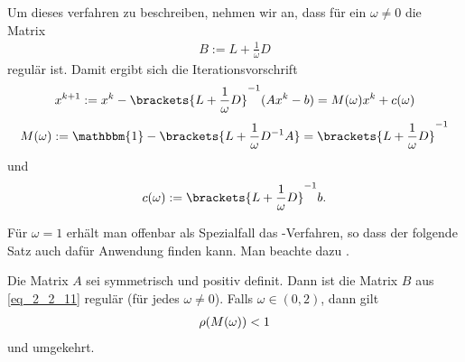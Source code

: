 Um dieses verfahren zu beschreiben, nehmen wir an, dass für ein $\omega \neq 0$ die Matrix
\begin{align}
	B:=L + \frac{1}{\omega}D \label{eq_2_2_11}
\end{align}
regulär ist. Damit ergibt sich die Iterationsvorschrift
\begin{align}
	x^{k+1} := x^k - \brackets{L+\frac{1}{\omega}D}^{-1}(Ax^k - b) = M(\omega)x^k + c(\omega)\notag
\end{align}
\begin{align}
	M(\omega) := \mathbbm{1} -  \brackets{L + \frac{1}{\omega} D^{-1} A} 
	= \brackets{L + \frac{1}{\omega} D}^{-1}
\end{align}
und
\begin{align}
	c(\omega) :=  \brackets{L+\frac{1}{\omega}D}^{-1}b.
\end{align}

Für $\omega = 1$ erhält man offenbar als Spezialfall das -Verfahren, so dass der folgende Satz auch dafür Anwendung finden kann. Man beachte dazu .

\begin{proposition}
	Die Matrix $A$ sei symmetrisch und positiv definit. Dann ist die Matrix $B$ aus \cref{eq_2_2_11} regulär (für jedes $\omega \neq 0$). Falls $\omega \in (0,2)$, dann gilt
	\begin{align}
		\rho(M(\omega)) < 1\notag
	\end{align}
	und umgekehrt.
\end{proposition}

